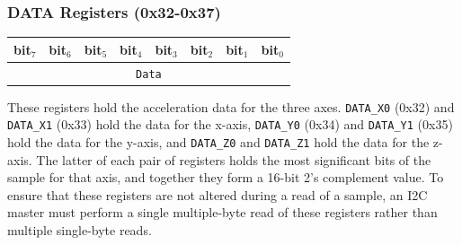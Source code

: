 \documentclass[11pt, twoside, pdftex]{article}
\begin{document}

\subsubsection{DATA Registers (0x32-0x37)}

\begin{table}[h]
    \centering
    \begin{tabular}{|l|l|l|l|l|l|l|l|}
        \hline
            \textbf{bit$_7$}
            & \textbf{bit$_6$}
            & \textbf{bit$_5$}
            & \textbf{bit$_4$}
            & \textbf{bit$_3$}
            & \textbf{bit$_2$}
            & \textbf{bit$_1$}
            & \textbf{bit$_0$}
        \\\hline
            \multicolumn{8}{|c|}{\texttt{Data}}
        \\\hline
    \end{tabular}
\end{table}

These registers hold the acceleration data for the three axes. \texttt{DATA\_X0} (0x32) and \texttt{DATA\_X1} (0x33) hold the data for the x-axis, \texttt{DATA\_Y0} (0x34) and \texttt{DATA\_Y1} (0x35) hold the data for the y-axis, and \texttt{DATA\_Z0} and \texttt{DATA\_Z1} hold the data for the z-axis. The latter of each pair of registers holds the most significant bits of the sample for that axis, and together they form a 16-bit 2's complement value. To ensure that these registers are not altered during a read of a sample, an I2C master must perform a single multiple-byte read of these registers rather than multiple single-byte reads.
\end{document}
